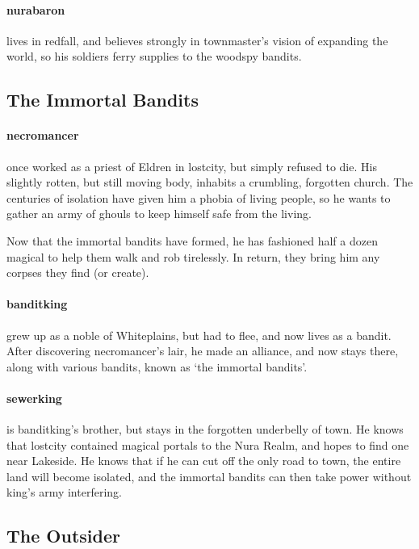 \begin{multicols}{2}
\paragraph{\Gls{nurabaron}}
lives in \gls{redfall}, and believes strongly in \gls{townmaster}'s vision of expanding the world, so his soldiers ferry supplies to the woodspy bandits.

\subsection{The Immortal Bandits}

\paragraph{\Gls{necromancer}}
once worked as a priest of Eldren in \gls{lostcity}, but simply refused to die.
His slightly rotten, but still moving body, inhabits a crumbling, forgotten church.
The centuries of isolation have given him a phobia of living people, so he wants to gather an army of ghouls to keep himself safe from the living.

Now that the immortal bandits have formed, he has fashioned half a dozen magical to help them walk and rob tirelessly.
In return, they bring him any corpses they find (or create).

\paragraph{\gls{banditking}}
grew up as a noble of Whiteplains, but had to flee, and now lives as a bandit.
After discovering \gls{necromancer}'s lair, he made an alliance, and now stays there, along with various bandits, known as `the immortal bandits'.

\paragraph{\gls{sewerking}}
is \gls{banditking}'s brother, but stays in the forgotten underbelly of \gls{town}.
He knows that \gls{lostcity} contained magical portals to the Nura Realm, and hopes to find one near Lakeside.
He knows that if he can cut off the only road to \gls{town}, the entire land will become isolated, and the immortal bandits can then take power without \gls{king}'s army interfering.

\subsection{The Outsider}


\end{multicols}
